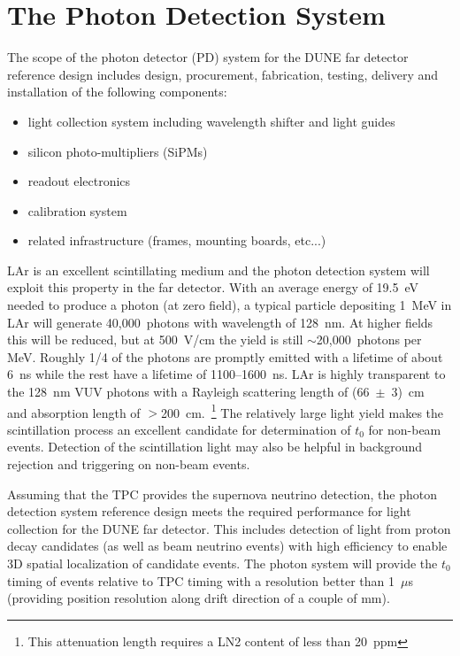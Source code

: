 \section{The Photon Detection System}
\label{sec:detectors-fd-ref-pd}

The scope of the photon detector (PD) system for the DUNE far detector
reference design includes design, procurement, fabrication,
testing, delivery and installation of the following components:
\begin{itemize}
\item light collection system including wavelength shifter and light guides
\item silicon photo-multipliers (SiPMs)
\item readout electronics
\item calibration system
\item related infrastructure (frames, mounting boards, etc...)
\end{itemize}

LAr is an excellent scintillating medium and the photon
detection system will exploit this property in the far detector.  With
an average energy of 19.5~eV needed to produce a photon (at zero
field), a typical particle depositing 1~MeV in LAr will
generate 40,000~photons with wavelength of 128~nm. At higher fields
this will be reduced, but at 500~V/cm the yield is still
$\sim$20,000~photons per MeV. Roughly 1/4 of the photons are promptly
emitted with a lifetime of about 6~ns while the rest have a lifetime
of 1100--1600~ns. LAr is highly transparent to the 128~nm VUV photons
with a Rayleigh scattering length of (66~$\pm$~3)~cm~\cite{Rayleigh}
and absorption length of $>$200~cm.~\footnote{This attenuation length
  requires a LN2 content of less than 20~ppm}
   The relatively large light yield
makes the scintillation process an excellent candidate for
determination of $t_0$ for non-beam %
events. Detection of the
scintillation light may also be helpful in background rejection and
triggering on non-beam events.


Assuming that the TPC provides the supernova neutrino detection,
the photon detection system reference design 
meets the required performance for light collection for the DUNE far
detector. This includes detection of light from proton decay
candidates (as well as beam neutrino events) with high efficiency to
enable 3D spatial localization of candidate events. 
The photon system will provide the $t_0$ timing of
events relative to TPC timing with a resolution better than 1~$\mu$s
(providing position resolution along drift direction of a couple of mm). 

